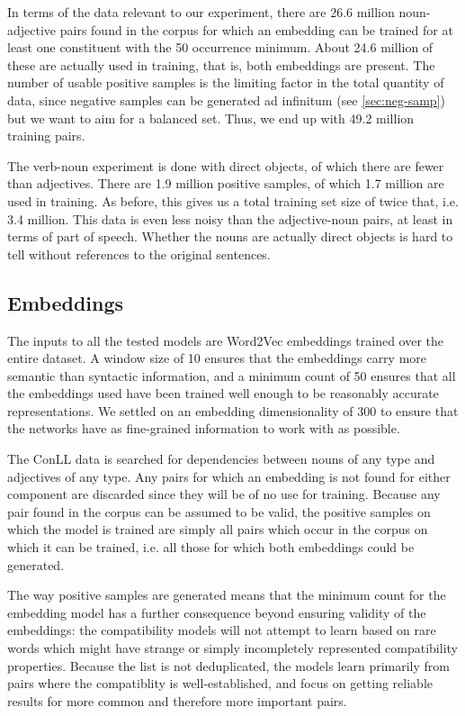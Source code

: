 \documentclass[a4paper, 12pt]{article}
\begin{document}
In terms of the data relevant to our experiment, there are 26.6 million noun-adjective pairs found in the corpus for which an embedding can be trained for at least one constituent with the 50 occurrence minimum. About 24.6 million of these are actually used in training, that is, both embeddings are present. The number of usable positive samples is the limiting factor in the total quantity of data, since negative samples can be generated ad infinitum (see \ref{sec:neg-samp}) but we want to aim for a balanced set. Thus, we end up with 49.2 million training pairs.

The verb-noun experiment is done with direct objects, of which there are fewer than adjectives. There are 1.9 million positive samples, of which 1.7 million are used in training. As before, this gives us a total training set size of twice that, i.e. 3.4 million. This data is even less noisy than the adjective-noun pairs, at least in terms of part of speech. Whether the nouns are actually direct objects is hard to tell without references to the original sentences.

\subsection{Embeddings}

The inputs to all the tested models are Word2Vec embeddings trained over the entire dataset. A window size of 10 ensures that the embeddings carry more semantic than syntactic information, and a minimum count of 50 ensures that all the embeddings used have been trained well enough to be reasonably accurate representations. We settled on an embedding dimensionality of 300 to ensure that the networks have as fine-grained information to work with as possible.

The ConLL data is searched for dependencies between nouns of any type and adjectives of any type. Any pairs for which an embedding is not found for either component are discarded since they will be of no use for training. Because any pair found in the corpus can be assumed to be valid, the positive samples on which the model is trained are simply all pairs which occur in the corpus on which it can be trained, i.e. all those for which both embeddings could be generated.

The way positive samples are generated means that the minimum count for the embedding model has a further consequence beyond ensuring validity of the embeddings: the compatibility models will not attempt to learn based on rare words which might have strange or simply incompletely represented compatibility properties. Because the list is not deduplicated, the models learn primarily from pairs where the compatiblity is well-established, and focus on getting reliable results for more common and therefore more important pairs.
\end{document}
